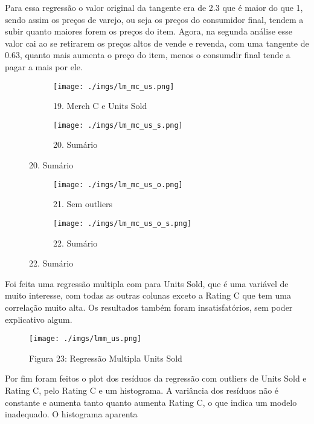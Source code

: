 \documentclass[12pt, a4paper]{article}
\begin{document}
Para essa regressão o valor original da tangente era de 2.3 que é maior do que 1, sendo assim os preços de varejo, ou seja os preços do consumidor final, tendem a subir quanto maiores forem os preços do item. Agora, na segunda análise esse valor cai ao se retirarem os preços altos de vende e revenda, com uma tangente de 0.63, quanto mais aumenta o preço do item, menos o consumdir final tende a pagar a mais por ele.

\FloatBarrier
\begin{figure}[h]
  \begin{subfigure}[b]{0.4\textwidth}
    \texttt{[image: ./imgs/lm\_mc\_us.png]}
    \caption*{19. Merch C e Units Sold}
    \label{fig:1}
  \end{subfigure}
  \begin{subfigure}[b]{0.5\textwidth}
    \texttt{[image: ./imgs/lm\_mc\_us\_s.png]}
    \caption*{20. Sumário}
    \label{fig:2}
  \end{subfigure}
\end{figure}
\FloatBarrier 

\FloatBarrier
\begin{figure}[h]
  \begin{subfigure}[b]{0.4\textwidth}
    \texttt{[image: ./imgs/lm\_mc\_us\_o.png]}
    \caption*{21. Sem outliers}
    \label{fig:1}
  \end{subfigure}
  \begin{subfigure}[b]{0.5\textwidth}
    \texttt{[image: ./imgs/lm\_mc\_us\_o\_s.png]}
    \caption*{22. Sumário}
    \label{fig:2}
  \end{subfigure}
\end{figure}
\FloatBarrier 

Foi feita uma regressão multipla com para Units Sold, que é uma variável de muito interesse, com todas as outras colunas exceto a Rating C que tem uma correlação muito alta. Os resultados também foram insatisfatórios, sem poder explicativo algum.

\FloatBarrier
\begin{figure}[h]
\texttt{[image: ./imgs/lmm\_us.png]}
\caption*{Figura 23: Regressão Multipla Units Sold}
\end{figure}
\FloatBarrier 

Por fim foram feitos o plot dos resíduos da regressão com outliers de Units Sold e Rating C, pelo Rating C e um histograma. A variância dos resíduos não é constante e aumenta tanto quanto aumenta Rating C, o que indica um modelo inadequado. O histograma aparenta%
\end{document}
